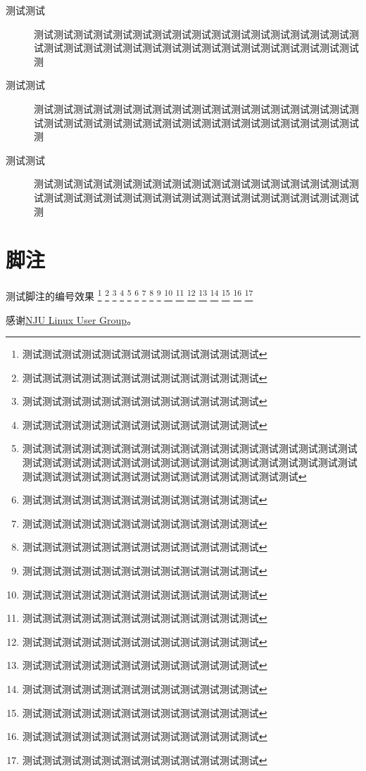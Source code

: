 \documentclass{njuthesis}
\begin{document}
\begin{description}
    \item[测试测试] 测试测试测试测试测试测试测试测试测试测试测试测试测试测试测试测试测试测试测试测试测试测试测试测试测试测试测试测试测试测试测试测试测试测
    \item[测试测试] 测试测试测试测试测试测试测试测试测试测试测试测试测试测试测试测试测试测试测试测试测试测试测试测试测试测试测试测试测试测试测试测试测试测
    \item[测试测试] 测试测试测试测试测试测试测试测试测试测试测试测试测试测试测试测试测试测试测试测试测试测试测试测试测试测试测试测试测试测试测试测试测试测
\end{description}

\chapter{脚注}

测试脚注的编号效果%
\footnote{测试测试测试测试测试测试测试测试测试测试测试测试}%
\footnote{测试测试测试测试测试测试测试测试测试测试测试测试}%
\footnote{测试测试测试测试测试测试测试测试测试测试测试测试}%
\footnote{测试测试测试测试测试测试测试测试测试测试测试测试}%
\footnote{测试测试测试测试测试测试测试测试测试测试测试测试测试测试测试测试测试测试测试测试测试测试测试测试测试测试测试测试测试测试测试测试测试测试测试测试测试测试测试测试测试测试测试测试测试测试测试测试}%
\footnote{测试测试测试测试测试测试测试测试测试测试测试测试}%
\footnote{测试测试测试测试测试测试测试测试测试测试测试测试}%
\footnote{测试测试测试测试测试测试测试测试测试测试测试测试}%
\footnote{测试测试测试测试测试测试测试测试测试测试测试测试}%
\footnote{测试测试测试测试测试测试测试测试测试测试测试测试}%
\footnote{测试测试测试测试测试测试测试测试测试测试测试测试}%
\footnote{测试测试测试测试测试测试测试测试测试测试测试测试}%
\footnote{测试测试测试测试测试测试测试测试测试测试测试测试}%
\footnote{测试测试测试测试测试测试测试测试测试测试测试测试}%
\footnote{测试测试测试测试测试测试测试测试测试测试测试测试}%
\footnote{测试测试测试测试测试测试测试测试测试测试测试测试}%
\footnote{测试测试测试测试测试测试测试测试测试测试测试测试}%


% 



\printbibliography

\begin{acknowledgement}
  感谢\href{https://git.nju.edu.cn/nju-lug/lug-introduction}{NJU Linux User Group}。
\end{acknowledgement}


% 
% 
\end{document}

